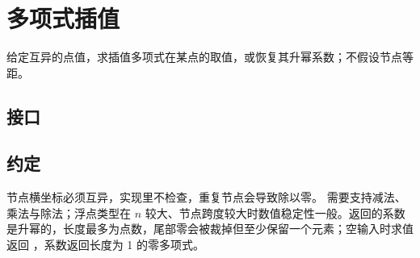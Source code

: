 \chapter{多项式插值}\label{ch:interpolation}


给定互异的点值，求插值多项式在某点的取值，或恢复其升幂系数；不假设节点等距。

\section{接口}


\section{约定}

节点横坐标必须互异，实现里不检查，重复节点会导致除以零。 需要支持减法、乘法与除法；浮点类型在 $n$ 较大、节点跨度较大时数值稳定性一般。返回的系数是升幂的，长度最多为点数，尾部零会被裁掉但至少保留一个元素；空输入时求值返回 ，系数返回长度为 1 的零多项式。

